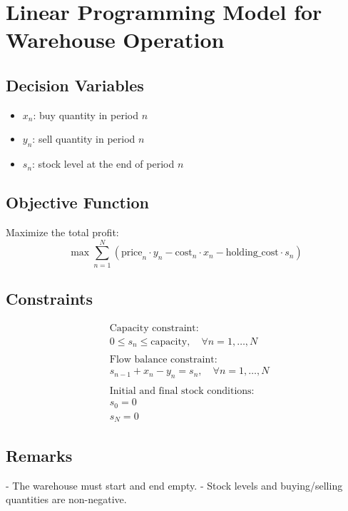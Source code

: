\documentclass{article}
\begin{document}
\section*{Linear Programming Model for Warehouse Operation}

\subsection*{Decision Variables}
\begin{itemize}
    \item \( x_n \): buy quantity in period \( n \)
    \item \( y_n \): sell quantity in period \( n \)
    \item \( s_n \): stock level at the end of period \( n \)
\end{itemize}

\subsection*{Objective Function}
Maximize the total profit:
\[
\max \sum_{n=1}^{N} \left( \text{price}_n \cdot y_n - \text{cost}_n \cdot x_n - \text{holding\_cost} \cdot s_n \right)
\]

\subsection*{Constraints}
\begin{align*}
    & \text{Capacity constraint:} \\
    & 0 \leq s_n \leq \text{capacity}, \quad \forall n = 1, \ldots, N \\
    \\
    & \text{Flow balance constraint:} \\
    & s_{n-1} + x_n - y_n = s_n, \quad \forall n = 1, \ldots, N \\
    \\
    & \text{Initial and final stock conditions:} \\
    & s_0 = 0 \\
    & s_N = 0
\end{align*}

\subsection*{Remarks}
- The warehouse must start and end empty.
- Stock levels and buying/selling quantities are non-negative.
\end{document}
